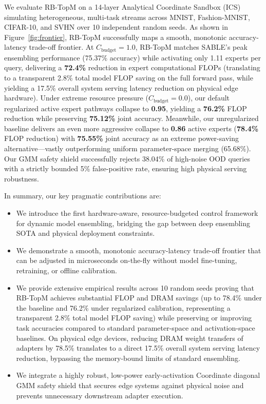 We evaluate RB-TopM on a 14-layer Analytical Coordinate Sandbox (ICS) simulating heterogeneous, multi-task streams across MNIST, Fashion-MNIST, CIFAR-10, and SVHN over 10 independent random seeds. As shown in Figure~\ref{fig:frontier}, RB-TopM successfully maps a smooth, monotonic accuracy-latency trade-off frontier. At $C_{\text{budget}} = 1.0$, RB-TopM matches SABLE's peak ensembling performance (75.37\% accuracy) while activating only 1.11 experts per query, delivering a \textbf{72.4\%} reduction in expert computational FLOPs (translating to a transparent 2.8\% total model FLOP saving on the full forward pass, while yielding a 17.5\% overall system serving latency reduction on physical edge hardware). Under extreme resource pressure ($C_{\text{budget}} = 0.0$), our default regularized active expert pathways collapse to \textbf{0.95}, yielding a \textbf{76.2\%} FLOP reduction while preserving \textbf{75.12\%} joint accuracy. Meanwhile, our unregularized baseline delivers an even more aggressive collapse to \textbf{0.86} active experts (\textbf{78.4\%} FLOP reduction) with \textbf{75.55\%} joint accuracy as an extreme power-saving alternative—vastly outperforming uniform parameter-space merging (65.68\%). Our GMM safety shield successfully rejects 38.04\% of high-noise OOD queries with a strictly bounded 5\% false-positive rate, ensuring high physical serving robustness.

In summary, our key pragmatic contributions are:
\begin{itemize}
    \item We introduce the first hardware-aware, resource-budgeted control framework for dynamic model ensembling, bridging the gap between deep ensembling SOTA and physical deployment constraints.
    \item We demonstrate a smooth, monotonic accuracy-latency trade-off frontier that can be adjusted in microseconds on-the-fly without model fine-tuning, retraining, or offline calibration.
    \item We provide extensive empirical results across 10 random seeds proving that RB-TopM achieves substantial FLOP and DRAM savings (up to 78.4\% under the baseline and 76.2\% under regularized calibration, representing a transparent 2.8\% total model FLOP saving) while preserving or improving task accuracies compared to standard parameter-space and activation-space baselines. On physical edge devices, reducing DRAM weight transfers of adapters by 78.5\% translates to a direct 17.5\% overall system serving latency reduction, bypassing the memory-bound limits of standard ensembling.
    \item We integrate a highly robust, low-power early-activation Coordinate diagonal GMM safety shield that secures edge systems against physical noise and prevents unnecessary downstream adapter execution.
\end{itemize}

